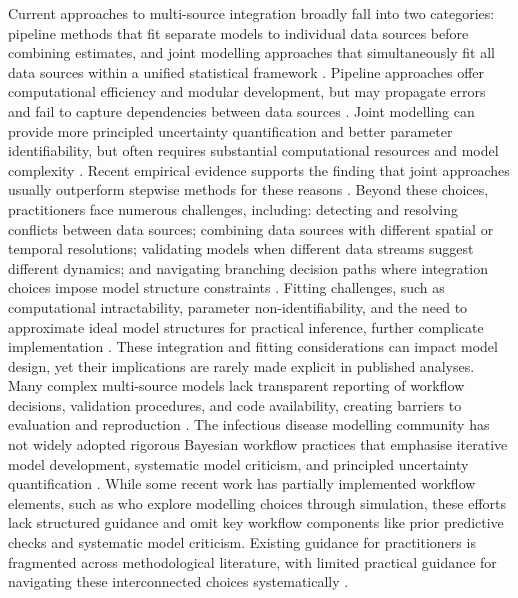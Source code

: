 \documentclass{article}
\begin{document}
Current approaches to multi-source integration broadly fall into two categories: pipeline methods that fit separate models to individual data sources before combining estimates, and joint modelling approaches that simultaneously fit all data sources within a unified statistical framework \citep{deangelis2018analysing, russell2024combined}.
Pipeline approaches offer computational efficiency and modular development, but may propagate errors and fail to capture dependencies between data sources \citep{lison2024generative, Ward2024-sp}.
Joint modelling can provide more principled uncertainty quantification and better parameter identifiability, but often requires substantial computational resources and model complexity \citep{russell2024combined, lison2024generative}.
Recent empirical evidence supports the finding that joint approaches usually outperform stepwise methods for these reasons \citep{lison2024generative}.
Beyond these choices, practitioners face numerous challenges, including: detecting and resolving conflicts between data sources; combining data sources with different spatial or temporal resolutions; validating models when different data streams suggest different dynamics; and navigating branching decision paths where integration choices impose model structure constraints \citep{deangelis2018analysing, nicholson2022interoperability}.
Fitting challenges, such as computational intractability, parameter non-identifiability, and the need to approximate ideal model structures for practical inference, further complicate implementation \citep{corbella2022inferring, Ward2024-sp}.
These integration and fitting considerations can impact model design, yet their implications are rarely made explicit in published analyses.
Many complex multi-source models lack transparent reporting of workflow decisions, validation procedures, and code availability, creating barriers to evaluation and reproduction \citep{Ward2024-sp, Fyles2024-qz, Abbott2021-delta, Abbott2022-prevalence}.
The infectious disease modelling community has not widely adopted rigorous Bayesian workflow practices that emphasise iterative model development, systematic model criticism, and principled uncertainty quantification \citep{gelman2020bayesian, nicholson2022interoperability}.
While some recent work has partially implemented workflow elements, such as \citet{bouman2024bayesian} who explore modelling choices through simulation, these efforts lack structured guidance and omit key workflow components like prior predictive checks and systematic model criticism.
Existing guidance for practitioners is fragmented across methodological literature, with limited practical guidance for navigating these interconnected choices systematically \citep{nicholson2022interoperability, deangelis2018analysing}.
\end{document}

